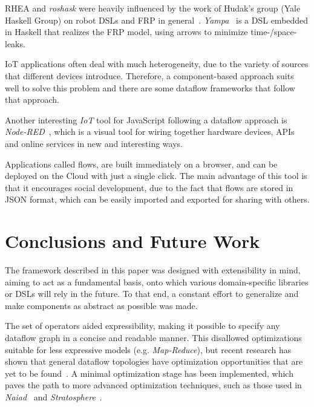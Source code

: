 \documentclass[sigplan,review,anonymous,screen]{acmart}
\begin{document}
\textsc{RHEA} and \textit{roshask} were heavily influenced by the work of Hudak's
group (Yale Haskell Group) on robot DSLs and FRP in general~\cite{fran,arrows_robots,lambda_in_motion}.
\textit{Yampa}~\cite{yampa} is a DSL embedded in Haskell
that realizes the FRP model, using arrows to minimize time-/space- leaks.


IoT applications often deal with much heterogeneity, due to the variety of
sources that different devices introduce. Therefore, a component-based approach
suits well to solve this problem and there are some dataflow frameworks that
follow that approach.

Another interesting \textit{IoT} tool for JavaScript following a dataflow
approach is \textit{Node-RED}~\cite{iot_dataflow}, which is a visual tool for wiring
together hardware devices, APIs and online services in new and interesting ways.

Applications called flows, are built immediately on a browser, and can be
deployed on the Cloud with just a single click. The main advantage of this tool
is that it encourages social development, due to the fact that flows are stored
in JSON format, which can be easily imported and exported for sharing with
others.

\section{Conclusions and Future Work} \label{sec:conclusions}

The framework described in this paper was designed with extensibility in mind,
aiming to act as a fundamental basis, onto which various domain-specific
libraries or DSLs will rely in the future. To that end, a constant effort to
generalize and make components as abstract as possible was made.

The set of operators aided expressibility, making it possible to specify any
dataflow graph in a concise and readable manner. This disallowed optimizations
suitable for less expressive models (e.g. \textit{Map-Reduce}), but recent
research has shown that general dataflow topologies have optimization
opportunities that are yet to be found~\cite{blackbox}. A minimal optimization
stage has been implemented, which paves the path to more advanced optimization
techniques, such as those used in \textit{Naiad}~\cite{naiad} and
\textit{Stratosphere}~\cite{blackbox}.
\end{document}
